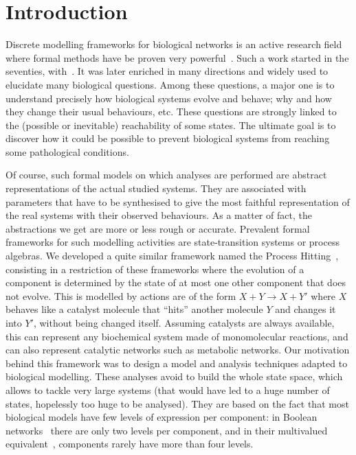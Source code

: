 \section{Introduction}
\label{sec:intro}

Discrete modelling frameworks for biological networks is an active research field where formal
methods have be proven very
powerful~\cite{thomas1990biological,deJong02,snoussi_logical_1993}.
Such a work started in the seventies, with~\cite{kauffman69,Thomas73}.
It was later enriched in many directions and widely used to elucidate many biological questions.
Among these questions, a major one is to understand precisely how biological systems evolve and behave; why and how they change their usual behaviours, etc.
These questions are strongly linked to the (possible or inevitable) reachability of some states.
The ultimate goal is to discover how it could be possible to prevent biological systems from reaching some pathological conditions.

Of course, such formal models on which analyses are performed are abstract representations of the actual studied systems.
They are associated with parameters that have to be synthesised %
to give the most faithful representation of the real systems with their observed behaviours.
As a matter of fact, the abstractions we get are more or less rough or accurate.
Prevalent formal frameworks for such modelling activities are state-transition systems or process algebras. %
We developed a quite similar framework named the Process Hitting~\cite{PMR10-TCSB},
consisting in a restriction of these frameworks where the evolution of a component is determined by the state of at most one other component that does not evolve.
This is modelled by actions are of the form $X + Y \rightarrow X + Y'$ where $X$ behaves like a catalyst molecule that “hits” another molecule $Y$ and changes it into $Y'$, without being changed itself.
Assuming catalysts are always available, this can represent any biochemical system made of monomolecular reactions, and can also represent catalytic networks such as metabolic networks.
Our motivation behind this framework was to design a model and analysis techniques adapted to biological modelling.
These analyses avoid to build the whole state space, which allows to tackle very large systems (that would have led to a huge number of states, hopelessly too huge to be analysed).
They are based on the fact that most biological models have few levels of expression per component:
in Boolean networks~\cite{kauffman69,Thomas73} there are only two levels per component, and in their multivalued equivalent~\cite{deJong02}, components rarely have more than four levels.

